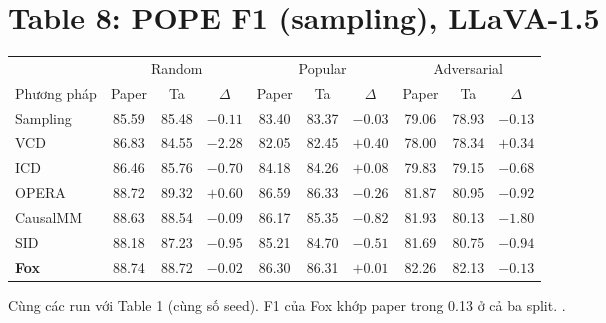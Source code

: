 \section{Table 8: POPE F1 (sampling), LLaVA-1.5}
\begin{center}\small
\begin{tabular}{@{}l *{3}{ccc}@{}}
\toprule
& \multicolumn{3}{c}{Random} & \multicolumn{3}{c}{Popular} & \multicolumn{3}{c}{Adversarial} \\
\cmidrule(lr){2-4}\cmidrule(lr){5-7}\cmidrule(lr){8-10}
Phương pháp & Paper & Ta & $\Delta$ & Paper & Ta & $\Delta$ & Paper & Ta & $\Delta$ \\
\midrule
Sampling & 85.59 & 85.48 & $-0.11$ & 83.40 & 83.37 & $-0.03$ & 79.06 & 78.93 & $-0.13$ \\
VCD & 86.83 & 84.55 & $-2.28$ & 82.05 & 82.45 & $+0.40$ & 78.00 & 78.34 & $+0.34$ \\
ICD & 86.46 & 85.76 & $-0.70$ & 84.18 & 84.26 & $+0.08$ & 79.83 & 79.15 & $-0.68$ \\
OPERA & 88.72 & 89.32 & $+0.60$ & 86.59 & 86.33 & $-0.26$ & 81.87 & 80.95 & $-0.92$ \\
CausalMM & 88.63 & 88.54 & $-0.09$ & 86.17 & 85.35 & $-0.82$ & 81.93 & 80.13 & $-1.80$ \\
SID & 88.18 & 87.23 & $-0.95$ & 85.21 & 84.70 & $-0.51$ & 81.69 & 80.75 & $-0.94$ \\
\textbf{Fox} & 88.74 & 88.72 & $-0.02$ & 86.30 & 86.31 & $+0.01$ & 82.26 & 82.13 & $-0.13$ \\
\bottomrule
\end{tabular}
\end{center}
\noindent\small Cùng các run với Table 1 (cùng số seed). F1 của Fox khớp paper trong 0.13 ở cả ba split. .

